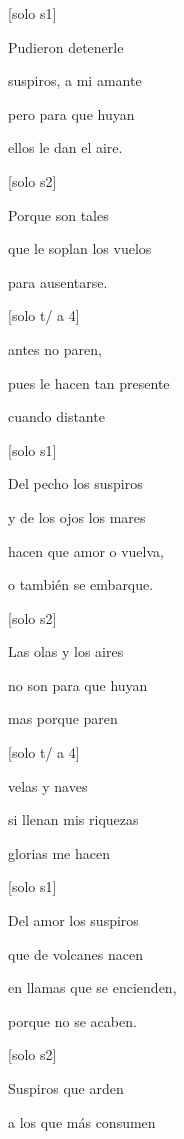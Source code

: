 \documentclass[titlepage,hidelinks]{article}
\begin{document}


\centering
\Large{

{[}solo s1{]}

Pudieron detenerle

suspiros, a mi amante

pero para que huyan

ellos le dan el aire.
\vspace{2\baselineskip}

{[}solo s2{]}

Porque son tales

que le soplan los vuelos

para ausentarse.
\vspace{2\baselineskip}

{[}solo t/ a 4{]}

antes no paren,

pues le hacen tan presente

cuando distante
\vspace{2\baselineskip}

{[}solo s1{]}

Del pecho los suspiros

y de los ojos los mares

hacen que amor o vuelva,

o también se embarque.
\vspace{2\baselineskip}

{[}solo s2{]}

Las olas y los aires

no son para que huyan

mas porque paren
\vspace{2\baselineskip}

{[}solo t/ a 4{]}

velas y naves

si llenan mis riquezas

glorias me hacen
\vspace{2\baselineskip}

{[}solo s1{]}

Del amor los suspiros

que de volcanes nacen

en llamas que se encienden,

porque no se acaben.
\vspace{2\baselineskip}

 {[}solo s2{]}

Suspiros que arden

a los que más consumen

}
\end{document}
